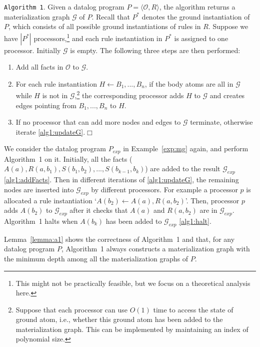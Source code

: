 \documentclass{article}
\begin{document}
\noindent\texttt{Algorithm~1}. Given a datalog program $P=\langle\mathcal{O}, R\rangle$, the algorithm
returns a materialization graph $\mathcal{G}$ of $P$. Recall that $P^*$ denotes the ground instantiation of $P$,
which consists of all possible ground instantiations of rules in $R$. Suppose we have
$|P^*|$ processors,\footnote{This might not be practically feasible, but we focus on a theoretical analysis here.} and each rule instantiation in $P^*$ is assigned to one processor.
Initially $\mathcal{G}$ is empty. The following three steps are then performed:
\begin{enumerate}[leftmargin=8ex,label=(\textit{Step \arabic*}),ref=Step~\arabic*]
\item Add all facts in $\mathcal{O}$ to $\mathcal{G}$.\label{alg1:addFacts}
\item For each rule instantiation $H\leftarrow B_1,...,B_n$, if the body atoms are all in $\mathcal{G}$ while $H$ is not in $\mathcal{G}$,\footnote{Suppose that each processor can use $O(1)$ time to access the state of ground atom, i.e., whether this ground atom has been added to the materialization graph. This can be implemented by maintaining an
index of polynomial size.}
the corresponding processor adds $H$ to $\mathcal{G}$ and creates edges pointing from $B_1,...,B_n$ to $H$.\label{alg1:updateG}
\item If no processor that can add more nodes and edges to $\mathcal{G}$ terminate, otherwise iterate \ref{alg1:updateG}.\label{alg1:halt}\hfill$\Box$
\end{enumerate}

\begin{example}
We consider the datalog program $P_{exp}$ in Example~\ref{exp:mg} again, and perform Algorithm~1 on it. Initially, all the facts
($A(a),R(a,b_1),S(b_1,b_2),...,S(b_{k-1},b_{k})$) are added to the result $\mathcal{G}_{exp}$ \ref{alg1:addFacts}. Then in different iterations of \ref{alg1:updateG}, the remaining nodes are inserted into
$\mathcal{G}_{exp}$ by different processors. For example a processor $p$ is allocated a rule instantiation `$A(b_2)\leftarrow A(a),R(a,b_2)$'. Then, processor $p$ adds $A(b_2)$ to $\mathcal{G}_{exp}$ after it checks that $A(a)$ and $R(a,b_2)$ are in $\mathcal{G}_{exp}$. Algorithm~1 halts when $A(b_k)$ has been added to $\mathcal{G}_{exp}$ \ref{alg1:halt}.
\end{example}

Lemma~\ref{lemma:a1} shows the correctness of Algorithm~1 and that, for any datalog program $P$, Algorithm~1 always constructs a materialization graph with the minimum depth among all the materialization graphs of $P$.
\end{document}

